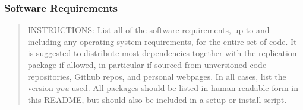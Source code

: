 \documentclass[
]{article}
\begin{document}
\hypertarget{software-requirements}{%
\subsubsection{Software Requirements}\label{software-requirements}}

\begin{quote}
INSTRUCTIONS: List all of the software requirements, up to and including
any operating system requirements, for the entire set of code. It is
suggested to distribute most dependencies together with the replication
package if allowed, in particular if sourced from unversioned code
repositories, Github repos, and personal webpages. In all cases, list
the version \emph{you} used. All packages should be listed in
human-readable form in this README, but should also be included in a
setup or install script.
\end{quote}
\end{document}
